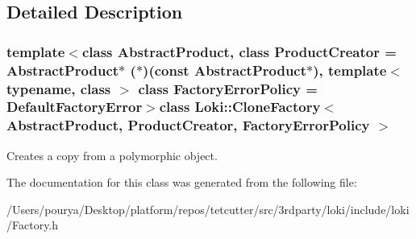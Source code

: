 \subsection{Detailed Description}
\subsubsection*{template$<$class Abstract\+Product, class Product\+Creator = Abstract\+Product$\ast$ ($\ast$)(const Abstract\+Product$\ast$), template$<$ typename, class $>$ class Factory\+Error\+Policy = Default\+Factory\+Error$>$class Loki\+::\+Clone\+Factory$<$ Abstract\+Product, Product\+Creator, Factory\+Error\+Policy $>$}

Creates a copy from a polymorphic object. 

The documentation for this class was generated from the following file\+:\begin{DoxyCompactItemize}
\item 
/\+Users/pourya/\+Desktop/platform/repos/tetcutter/src/3rdparty/loki/include/loki/Factory.\+h\end{DoxyCompactItemize}
